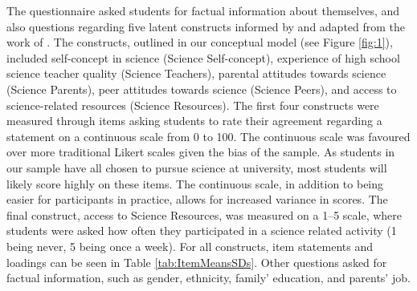 The questionnaire asked students for factual information about themselves, and also questions regarding five latent constructs informed by and adapted from the work of \cite{dewitt2011high}. The constructs, outlined in our conceptual model (see Figure \ref{fig:1}), included self-concept in science (Science Self-concept), experience of high school science teacher quality (Science Teachers), parental attitudes towards science (Science Parents), peer attitudes towards science (Science Peers), and access to science-related resources (Science Resources). The first four constructs were measured through items asking students to rate their agreement regarding a statement on a continuous scale from 0 to 100. The continuous scale was favoured over more traditional Likert scales given the bias of the sample. As students in our sample have all chosen to pursue science at university, most students will likely score highly on these items. The continuous scale, in addition to being easier for participants in practice, allows for increased variance in scores. The final construct, access to Science Resources, was measured on a 1--5 scale, where students were asked how often they participated in a science related activity (1 being never, 5 being once a week). For all constructs, item statements and loadings can be seen in Table \ref{tab:ItemMeansSDs}. Other questions asked for factual information, such as gender, ethnicity, family’ education, and parents' job. 

